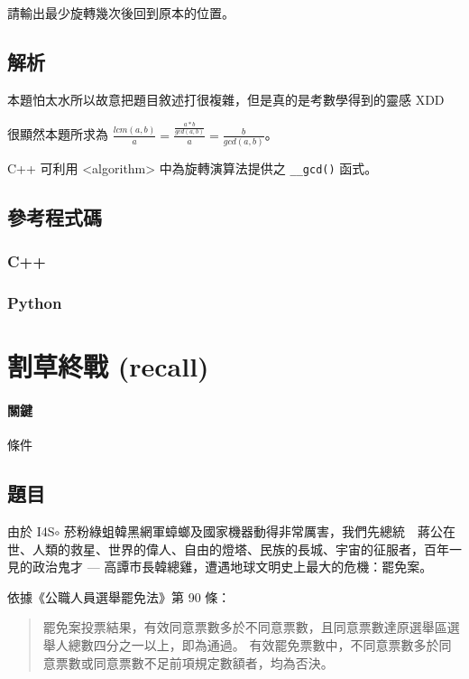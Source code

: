 \documentclass[a4paper,10pt]{article}
\begin{document}
請輸出最少旋轉幾次後回到原本的位置。

\subsection{解析}

本題怕太水所以故意把題目敘述打很複雜，但是真的是考數學得到的靈感 XDD

很顯然本題所求為 $ \frac{lcm(a, b)}{a} = \frac{\frac{a * b}{gcd(a, b)}}{a} = \frac{b}{gcd(a, b)} $。

C++ 可利用 <algorithm> 中為旋轉演算法提供之 \texttt{__gcd()} 函式。

\subsection{參考程式碼}

\subsubsection{C++}



\subsubsection{Python}



\section{割草終戰 (recall)}

\paragraph{關鍵} 條件

\subsection{題目}

由於 I4S$\circ$ 菸粉綠蛆韓黑網軍蟑螂及國家機器動得非常厲害，我們先總統　蔣公在世、人類的救星、世界的偉人、自由的燈塔、民族的長城、宇宙的征服者，百年一見的政治鬼才 --- 高譚市長韓總雞，遭遇地球文明史上最大的危機：罷免案。

依據《公職人員選舉罷免法》第 90 條：
\begin{quote}
罷免案投票結果，有效同意票數多於不同意票數，且同意票數達原選舉區選舉人總數四分之一以上，即為通過。
有效罷免票數中，不同意票數多於同意票數或同意票數不足前項規定數額者，均為否決。
\end{quote}
\end{document}
